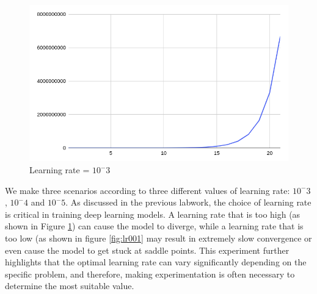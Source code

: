 \documentclass{article}
\begin{document}
\begin{figure}[H]
    \centering
    \includegraphics[width=0.75\linewidth]{image/lr001.png}
    \caption{Learning rate = $10^-3$}
    \label{fig:lr11}
\end{figure}


We make three scenarios according to three different values of learning rate: $10^-3$, $10^-4$ and $10^-5$. As discussed in the previous labwork, the choice of learning rate is critical in training deep learning models. A learning rate that is too high (as shown in Figure \ref{fig:lr11}) can cause the model to diverge, while a learning rate that is too low (as shown in figure \ref{fig:lr001} may result in extremely slow convergence or even cause the model to get stuck at saddle points. This experiment further highlights that the optimal learning rate can vary significantly depending on the specific problem, and therefore, making experimentation is often necessary to determine the most suitable value.
\end{document}
